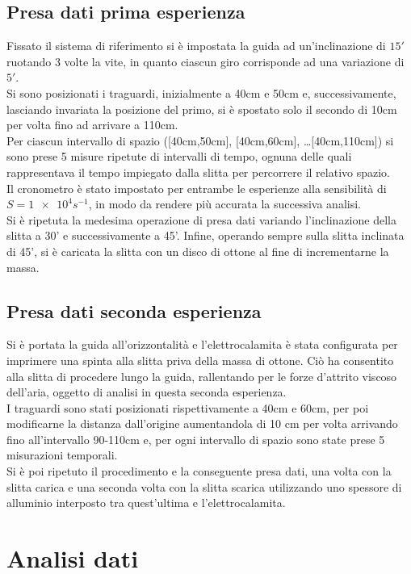 \documentclass[a4paper,11pt,oneside]{article}
\begin{document}
\subsection{Presa dati prima esperienza}
Fissato il sistema di riferimento si è impostata la guida ad un'inclinazione di $15'$ ruotando 3 volte la vite, in quanto ciascun giro corrisponde ad una variazione di $5'$.\\
Si sono posizionati i traguardi, inizialmente a 40cm e 50cm e, successivamente, lasciando invariata la posizione del primo, si è spostato solo il secondo di 10cm per volta fino ad arrivare a 110cm. \\
Per ciascun intervallo di spazio ([40cm,50cm], [40cm,60cm], \dots [40cm,110cm]) si sono prese 5 misure ripetute di intervalli di tempo, ognuna delle quali rappresentava il tempo impiegato dalla slitta per percorrere il relativo spazio.\\  
Il cronometro è stato impostato per entrambe le esperienze alla sensibilità di $S = \num{1e4} \si{s^{-1}}$, in modo da rendere più accurata la successiva analisi.\\
Si è ripetuta la medesima operazione di presa dati variando l'inclinazione della slitta a 30' e successivamente a 45'.
Infine, operando sempre sulla slitta inclinata di 45', si è caricata la slitta con un disco di ottone al fine di incrementarne la massa.

\subsection{Presa dati seconda esperienza}
Si è portata la guida all'orizzontalità e l'elettrocalamita è stata configurata per imprimere una spinta alla slitta priva della massa di ottone. Ciò ha consentito alla slitta di procedere lungo la guida, rallentando per le forze d'attrito viscoso dell'aria, oggetto di analisi in questa seconda esperienza.\\
I traguardi sono stati posizionati rispettivamente a 40cm e 60cm, per poi modificarne la distanza dall'origine aumentandola di 10 cm per volta arrivando fino all'intervallo 90-110cm e, per ogni intervallo di spazio sono state prese 5 misurazioni temporali.\\
Si è poi ripetuto il procedimento e la conseguente presa dati, una volta con la slitta carica e una seconda volta con la slitta scarica utilizzando uno spessore di alluminio interposto tra quest'ultima e l'elettrocalamita.

\section{Analisi dati}
\end{document}
